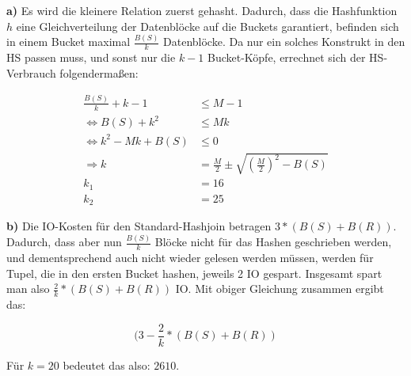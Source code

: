 \documentclass[12pt]{article}
\begin{document}
\textbf{a)} Es wird die kleinere Relation zuerst gehasht. Dadurch, dass die
Hashfunktion $h$ eine Gleichverteilung der Datenblöcke auf die Buckets
garantiert, befinden sich in einem Bucket maximal $\frac{B(S)}{k}$ Datenblöcke.
Da nur ein solches Konstrukt in den HS passen muss, und sonst nur die $k-1$
Bucket-Köpfe, errechnet sich der HS-Verbrauch folgendermaßen:

\begin{align*}
    \frac{B(S)}{k} + k - 1 &\leq M - 1\\
    \Leftrightarrow B(S) + k^2 &\leq Mk\\
    \Leftrightarrow k^2 - Mk + B(S) &\leq 0\\
    \Rightarrow k &= \frac{M}{2} \pm \sqrt{\left(\frac{M}{2}\right)^2 - B(S)}\\
    k_1 &= 16\\
    k_2 &= 25
\end{align*}

\textbf{b)} Die IO-Kosten für den Standard-Hashjoin betragen $3*(B(S)+B(R))$.
Dadurch, dass aber nun $\frac{B(S)}{k}$ Blöcke nicht für das Hashen
geschrieben werden, und dementsprechend auch nicht wieder gelesen werden müssen,
werden für Tupel, die in den ersten Bucket hashen, jeweils 2 IO gespart.
Insgesamt spart man also $\frac{2}{k}*(B(S)+B(R))$ IO.
Mit obiger Gleichung zusammen ergibt das:

    $$(3-\frac{2}{k} * (B(S)+B(R))$$

Für $k=20$ bedeutet das also: $2610$.
\end{document}
